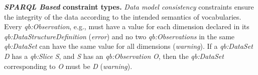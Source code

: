 \documentclass[conference]{IEEEtran}
\begin{document}
\textbf{\emph{SPARQL Based} constraint types.}
%
\emph{Data model consistency} constraints ensure the integrity of
the data according to the intended semantics of vocabularies.
Every \emph{qb:Observation}, e.g., must have a value for each dimension
declared in its \emph{qb:DataStructureDefinition} (\emph{error})
and no two \emph{qb:Observations} in the same \emph{qb:DataSet}
can have the same value for all dimensions (\emph{warning}).
If a \emph{qb:DataSet} \emph{D} has a \emph{qb:Slice} \emph{S}, and \emph{S} has an
\emph{qb:Observation} \emph{O}, then the \emph{qb:DataSet} corresponding to \emph{O} must be \emph{D} (\emph{warning}).
\end{document}
